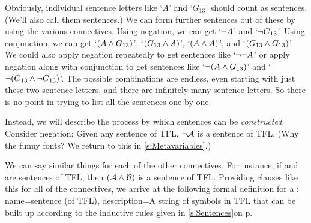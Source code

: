 Obviously, individual sentence letters like `$A$' and `$G_{13}$' should count as sentences. (We'll also call them  sentences.) We can form further sentences out of these by using the various connectives. Using negation, we can get `$\neg A$' and `$\neg G_{13}$'. Using conjunction, we can get `$(A \wedge G_{13})$', `$(G_{13} \wedge A)$', `$(A \wedge A)$', and `$(G_{13} \wedge G_{13})$'. We could also apply negation repeatedly to get sentences like `$\neg \neg A$' or apply negation along with conjunction to get sentences like `$\neg(A \wedge G_{13})$' and `$\neg(G_{13} \wedge \neg G_{13})$'. The possible combinations are endless, even starting with just these two sentence letters, and there are infinitely many sentence letters. So there is no point in trying to list all the sentences one by one.

Instead, we will describe the process by which sentences can be \emph{constructed}. Consider negation: Given any sentence  of TFL, $\neg\mathcal{A}$ is a sentence of TFL. (Why the funny fonts? We return to this in \cref{s:Metavariables}.)

We can say similar things for each of the other connectives. For instance, if  and  are sentences of TFL, then $(\mathcal{A}\wedge\mathcal{B})$ is a sentence of TFL. Providing clauses like this for all of the connectives, we arrive at the following formal definition for a :
{
name=sentence (of TFL),
description={A string of symbols in TFL that can be built up according to the inductive rules given \ifHTMLtarget in \cref{s:Sentences}\else on p.~\pageref{TFLsentences}\fi}
}

